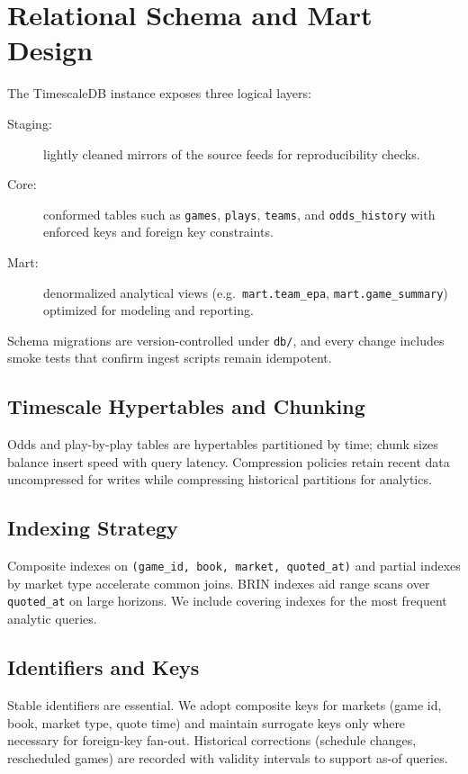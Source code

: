 \section{Relational Schema and Mart Design}\label{sec:schema-mart}
The TimescaleDB instance exposes three logical layers:
\begin{description}
  \item[Staging:] lightly cleaned mirrors of the source feeds for reproducibility checks.
  \item[Core:] conformed tables such as \texttt{games}, \texttt{plays}, \texttt{teams}, and \texttt{odds\_history} with enforced keys and foreign key constraints.
  \item[Mart:] denormalized analytical views (e.g.\ \texttt{mart.team\_epa}, \texttt{mart.game\_summary})\\ optimized for modeling and reporting.
\end{description}
Schema migrations are version-controlled under \texttt{db/}, and every change includes smoke tests that confirm ingest scripts remain idempotent.

\subsection{Timescale Hypertables and Chunking}
Odds and play-by-play tables are hypertables partitioned by time; chunk sizes balance insert speed with query latency. Compression policies retain recent data uncompressed for writes while compressing historical partitions for analytics.

\subsection{Indexing Strategy}
Composite indexes on \texttt{(game\_id, book, market, quoted\_at)} and partial indexes by market type accelerate common joins. BRIN indexes aid range scans over \texttt{quoted\_at} on large horizons. We include covering indexes for the most frequent analytic queries.

\subsection{Identifiers and Keys}
Stable identifiers are essential. We adopt composite keys for markets (game id, book, market type, quote time) and maintain surrogate keys only where necessary for foreign-key fan-out. Historical corrections (schedule changes, rescheduled games) are recorded with validity intervals to support as-of queries.

